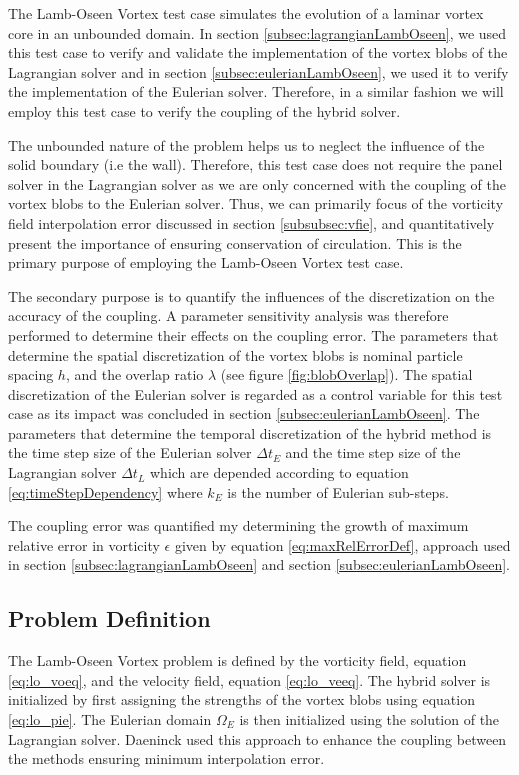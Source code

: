 The Lamb-Oseen Vortex test case simulates the evolution of a laminar vortex core in an unbounded domain. In section \ref{subsec:lagrangianLambOseen}, we used this test case to verify and validate the implementation of the vortex blobs of the Lagrangian solver and in section \ref{subsec:eulerianLambOseen}, we used it to verify the implementation of the Eulerian solver. Therefore, in a similar fashion we will employ this test case to verify the coupling of the hybrid solver. 

The unbounded nature of the problem helps us to neglect the influence of the solid boundary (i.e the wall). Therefore, this test case does not require the panel solver in the Lagrangian solver as we are only concerned with the coupling of the vortex blobs to the Eulerian solver. Thus, we can primarily focus of the vorticity field interpolation error discussed in section \ref{subsubsec:vfie}, and quantitatively present the importance of ensuring conservation of circulation. This is the primary purpose of employing the Lamb-Oseen Vortex test case.

The secondary purpose is to quantify the influences of the discretization on the accuracy of the coupling. A parameter sensitivity analysis was therefore performed to determine their effects on the coupling error. The parameters that determine the spatial discretization of the vortex blobs is nominal particle spacing $h$, and the overlap ratio $\lambda$ (see figure \ref{fig:blobOverlap}). The spatial discretization of the Eulerian solver is regarded as a control variable for this test case as its impact was concluded in section \ref{subsec:eulerianLambOseen}. The parameters that determine the temporal discretization of the hybrid method is the time step size of the Eulerian solver $\Delta t_E$ and the time step size of the Lagrangian solver $\Delta t_L$ which are depended according to equation \ref{eq:timeStepDependency} where $k_E$ is the number of Eulerian sub-steps.

The coupling error was quantified my determining the growth of maximum relative error in vorticity $\epsilon$ given by equation \ref{eq:maxRelErrorDef}, approach used in section \ref{subsec:lagrangianLambOseen} and section \ref{subsec:eulerianLambOseen}. 


\subsection{Problem Definition}

The Lamb-Oseen Vortex problem is defined by the vorticity field, equation \ref{eq:lo_voeq}, and the velocity field, equation \ref{eq:lo_veeq}. The hybrid solver is initialized by first assigning the strengths of the vortex blobs using equation \ref{eq:lo_pie}. The Eulerian domain $\Omega_E$ is then initialized using the solution of the Lagrangian solver. Daeninck \cite{Daeninck2006} used this approach to enhance the coupling between the methods ensuring minimum interpolation error.

